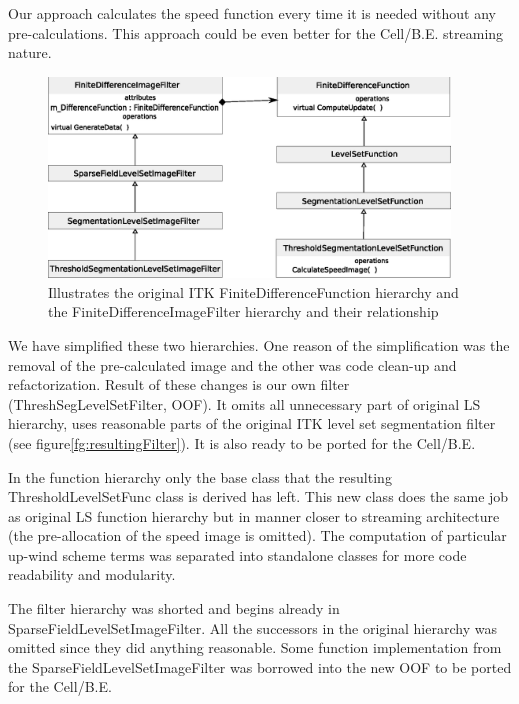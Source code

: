 \par
Our approach calculates the speed function every time it is needed without any pre-calculations.
This approach could be even better for the \mbox{Cell/B.E.} streaming nature.

\begin{figure}
    \centering
    \includegraphics[width=0.95\textwidth]{data/originalHierarchy}
    \caption[Original ITK thresholding level set filter class hierarchy]
{Illustrates the original ITK FiniteDifferenceFunction hierarchy and the FiniteDifferenceImageFilter hierarchy and their relationship}
    \label{fg:originalHierarchy}
\end{figure}

\par
We have simplified these two hierarchies.
One reason of the simplification was the removal of the pre-calculated image and the other was code clean-up and refactorization.
Result of these changes is our own filter (ThreshSegLevelSetFilter, OOF).
It omits all unnecessary part of original LS hierarchy, uses reasonable parts of the original ITK level set segmentation filter (see figure\ref{fg:resultingFilter}).
It is also ready to be ported for the \mbox{Cell/B.E.}

\par
In the function hierarchy only the base class that the resulting ThresholdLevelSetFunc class is derived has left.
This new class does the same job as original LS function hierarchy but in manner closer to streaming architecture (the pre-allocation of the speed image is omitted).
The computation of particular up-wind scheme terms was separated into standalone classes for more code readability and modularity.
\par
The filter hierarchy was shorted and begins already in SparseFieldLevelSetImageFilter.
All the successors in the original hierarchy was omitted since they did anything reasonable.
Some function implementation from the SparseFieldLevelSetImageFilter was borrowed into the new OOF to be ported for the \mbox{Cell/B.E.}

